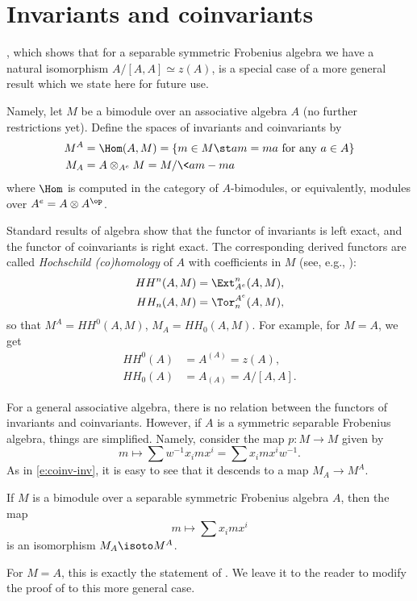 \section{Invariants and coinvariants}\label{s:invariants}
, which shows that for a separable symmetric Frobenius
algebra we have a natural isomorphism $A/[A,A]\simeq z(A)$, is a special
case of a more general result which we state here for future use.

Namely, let $M$ be a bimodule over an associative algebra $A$ (no further
restrictions yet). Define the spaces of invariants and coinvariants by
\begin{equation}\label{e:coinv}
  \begin{aligned}
    M^{A}&=\Hom(A,M)=\{m\in M\st am=ma \text{ for any } a\in A\}\\
    M_{A}&=A\otimes_{A^e} M = M/\<am-ma\>
  \end{aligned}
\end{equation}
where $\Hom$ is computed in the category of $A$-bimodules, or
equivalently, modules over $A^e=A\otimes A^\op$.

Standard results of algebra show that the functor of invariants is left
exact, and the functor of coinvariants is right exact. The corresponding
derived functors are called \emph{Hochschild (co)homology} of $A$ with
coefficients in $M$ (see, e.g., \cite[Section 11.1]{pierce}):
\begin{align*}
  HH^n(A,M)&=\Ext_{A^e}^n(A,M),\\
  HH_n(A,M)&=\Tor^{A^e}_n(A,M),
\end{align*}
so that $M^{A}=HH^0(A,M)$, $M_{A}=HH_0(A,M)$.
For example, for $M=A$, we get
\begin{align*}
  HH^0(A)&=A^{(A)}=z(A),\\
  HH_0(A)&=A_{(A)}= A/[A,A].
\end{align*}

For a general associative algebra, there is no relation between the functors of
invariants and coinvariants. However, if $A$ is a symmetric separable Frobenius
algebra, things are simplified. Namely, consider the map $p\colon M\to M$ given
by
$$
  m\mapsto \sum w^{-1} x_imx^i=\sum x_imx^i w^{-1}.
$$
As in \eqref{e:coinv-inv}, it is easy to see that it descends to a map
$M_{A}\to M^{A}$.
\begin{lemma}\label{l:coinv-separable}
  If $M$ is a bimodule over a separable symmetric Frobenius algebra $A$, then
  the map
  $$
  m \mapsto \sum x_imx^i
  $$
  is an isomorphism $M_{A}\isoto M^{A}$.
  \end{lemma}
For $M=A$, this is exactly the statement of . We leave it
to the reader to modify the proof of  to this more general
case.


